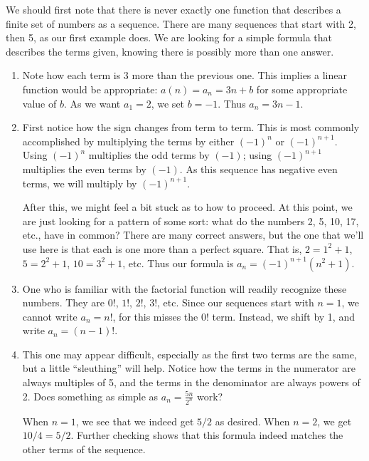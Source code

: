 {We should first note that there is never exactly one function that describes a finite set of numbers as a sequence. There are many sequences that start with 2, then 5, as our first example does. We are looking for a simple formula that describes the terms given, knowing there is possibly more than one answer.
\begin{enumerate}
\item		Note how each term is 3 more than the previous one. This implies a linear function would be appropriate: $a(n) = a_n = 3n + b$ for some appropriate value of $b$. As we want $a_1=2$, we set $b=-1$. Thus $a_n = 3n-1$.

\item		First notice how the sign changes from term to term. This is most commonly accomplished by multiplying the terms by either $(-1)^n$ or $(-1)^{n+1}$. Using $(-1)^n$ multiplies the odd terms by $(-1)$; using $(-1)^{n+1}$ multiplies the even terms by $(-1)$. As this sequence has negative even terms, we will multiply by $(-1)^{n+1}$. 

After this, we might feel a bit stuck as to how to proceed. At this point, we are just looking for a pattern of some sort: what do the numbers 2, 5, 10, 17, etc., have in common? There are many correct answers, but the one that we'll use here is that each is one more than a perfect square. That is, $2=1^2+1$, $5=2^2+1$, $10=3^2+1$, etc. Thus our formula is $a_n= (-1)^{n+1}(n^2+1)$.

\item		One who is familiar with the factorial function will readily recognize these numbers. They are $0!$, $1!$, $2!$, $3!$, etc. Since our sequences start with $n=1$, we cannot write $a_n = n!$, for this misses the $0!$ term. Instead, we shift by 1, and write $a_n = (n-1)!$.

\item		This one may appear difficult, especially as the first two terms are the same, but a little ``sleuthing'' will help. Notice how the terms in the numerator are always multiples of 5, and the terms in the denominator are always powers of 2. Does something as simple as $a_n = \frac{5n}{2^n}$ work?

When $n=1$, we see that we indeed get $5/2$ as desired. When $n=2$, we get $10/4 = 5/2$. Further checking shows that this formula indeed matches the other terms of the sequence.
\end{enumerate}
\baselineskip
}\\

